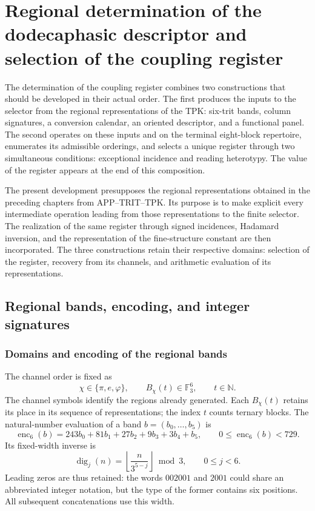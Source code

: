 \section{Regional determination of the dodecaphasic descriptor and selection of the coupling register}
\label{act21:chap:despliegue-selector-k}

The determination of the coupling register combines two constructions
that should be developed in their actual order. The first produces the
inputs to the selector from the regional representations of the TPK:
six-trit bands, column signatures, a conversion calendar,
an oriented descriptor, and a functional panel. The second operates on these
inputs and on the terminal eight-block repertoire, enumerates its
admissible orderings, and selects a unique register through two
simultaneous conditions: exceptional incidence and reading heterotypy.
The value of the register appears at the end of this composition.

The present development presupposes the regional representations obtained
in the preceding chapters from APP--TRIT--TPK. Its purpose is to make
explicit every intermediate operation leading from those representations
to the finite selector. The realization of the same
register through signed incidences, Hadamard inversion, and the
representation of the fine-structure constant are then incorporated. The three constructions
retain their respective domains: selection of the register, recovery
from its channels, and arithmetic evaluation of its representations.

\subsection{Regional bands, encoding, and integer signatures}

\subsubsection{Domains and encoding of the regional bands}

The channel order is fixed as
\[
 \chi\in\{\pi,e,\varphi\},
 \qquad B_\chi(t)\in\mathbb F_3^6,
 \qquad t\in\mathbb N.
\]
The channel symbols identify the regions already generated. Each
$B_\chi(t)$ retains its place in its sequence of representations;
the index $t$ counts ternary blocks. The natural-number evaluation of a
band $b=(b_0,\ldots,b_5)$ is
\begin{equation}
 \operatorname{enc}_6(b)=
 243b_0+81b_1+27b_2+9b_3+3b_4+b_5,
 \qquad 0\leq\operatorname{enc}_6(b)<729.
 \label{act21:eq:kdes-enc6}
\end{equation}
Its fixed-width inverse is
\[
 \operatorname{dig}_j(n)=
 \left\lfloor\frac{n}{3^{5-j}}\right\rfloor\bmod3,
 \qquad 0\leq j<6.
\]
Leading zeros are thus retained: the words $002001$ and $2001$
could share an abbreviated integer notation, but the type of the
former contains six positions. All subsequent concatenations
use this width.

